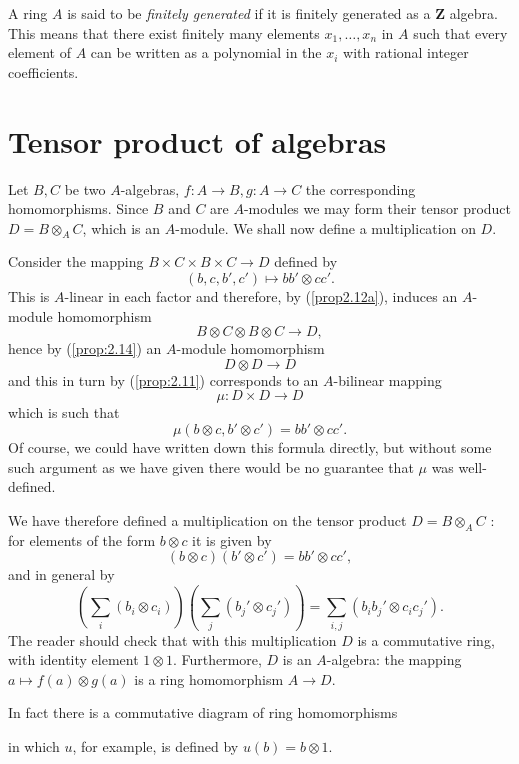 \documentclass{standalone}
\theoremstyle{definition}
\theoremstyle{remark}
\begin{document}
A ring $A$ is said to be {\itshape finitely generated} if it is finitely generated as a
$\mathbf{Z}$ algebra. This means that there exist finitely many elements
$x_{1}, \ldots, x_{n}$ in $A$ such that every element of $A$ can be written as a
polynomial in the $x_{i}$ with rational integer coefficients.

\section{Tensor product of algebras}
Let $B, C$ be two $A$-algebras, $f\colon A \to B, g\colon A \to C$ the corresponding
homomorphisms. Since $B$ and $C$ are $A$-modules we may form their tensor
product $D=B \otimes_{A} C$, which is an $A$-module. We shall now define a
multiplication on $D$.

Consider the mapping $B \times C \times B \times C \to D$ defined by
\[
  (b, c, b', c') \mapsto b b' \otimes c c' .
\]
This is $A$-linear in each factor and therefore, by (\ref{prop2.12a}),
induces an $A$-module homomorphism
\[
  B \otimes C \otimes B \otimes C \to D,
\]
hence by (\ref{prop:2.14}) an $A$-module homomorphism
\[
  D \otimes D \to D
\]
and this in turn by (\ref{prop:2.11}) corresponds to an $A$-bilinear mapping
\[
  \mu: D \times D \to D
\]
which is such that
\[
  \mu(b \otimes c, b' \otimes c')=b b' \otimes c c' .
\]
Of course, we could have written down this formula directly, but without some
such argument as we have given there would be no guarantee that $\mu$ was
well-defined.

We have therefore defined a multiplication on the tensor product $D=B
\otimes_{A} C$ : for elements of the form $b \otimes c$ it
is given by
\[
  (b \otimes c)(b' \otimes c')=b b' \otimes c c',
\]
and in general by
\[
  \left(\sum_{i}(b_{i} \otimes c_{i})\right)\left(\sum_{j}(b_{j}' \otimes c_{j}')\right)=\sum_{i, j}(b_{i} b_{j}' \otimes c_{i} c_{j}') .
\]
The reader should check that with this multiplication $D$ is a commutative ring,
with identity element $1 \otimes 1$. Furthermore, $D$ is an $A$-algebra: the
mapping $a \mapsto f(a) \otimes g(a)$ is a ring homomorphism $A \to D$.

In fact there is a commutative diagram of ring homomorphisms

\begin{center}
\end{center}
in which $u$, for example, is defined by $u(b)=b \otimes 1$.
\end{document}

